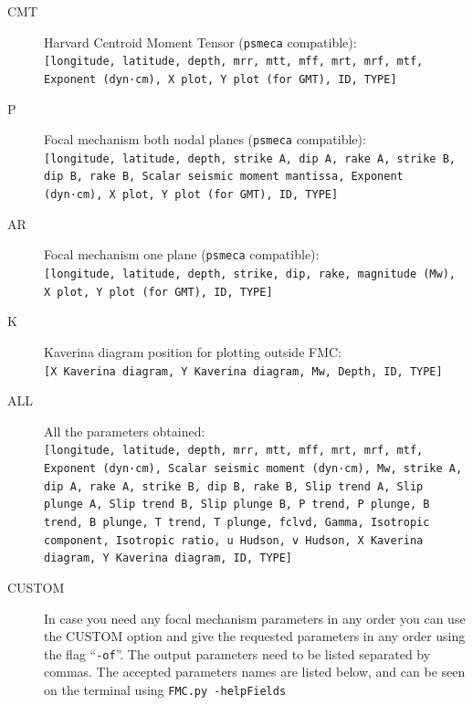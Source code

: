 \documentclass[11pt,a4paper,english]{article}
\numberwithin{equation}{section}
\begin{document}
\begin{description}
\item[CMT] Harvard Centroid Moment Tensor (\texttt{psmeca} compatible):\\
\texttt{[longitude, latitude, depth, mrr, mtt, mff, mrt, mrf, mtf, Exponent (dyn·cm), X plot, Y plot (for GMT), ID, TYPE]}
\item[P] Focal mechanism both nodal planes (\texttt{psmeca} compatible):\\
\texttt{[longitude, latitude, depth, strike A, dip A, rake A, strike B, dip B, rake B, Scalar seismic moment mantissa, Exponent (dyn·cm), X plot, Y plot (for GMT), ID, TYPE]}
\item[AR] Focal mechanism one plane (\texttt{psmeca} compatible):\\
\texttt{[longitude, latitude, depth, strike, dip, rake, magnitude (Mw), X plot, Y plot (for GMT), ID, TYPE]}
\item[K] Kaverina diagram position for plotting outside FMC:\\
\texttt{[X Kaverina diagram, Y Kaverina diagram, Mw, Depth, ID, TYPE]}
\item[ALL] All the parameters obtained:\\
\texttt{[longitude, latitude, depth, mrr, mtt, mff, mrt, mrf, mtf, Exponent (dyn·cm), Scalar seismic moment (dyn·cm), Mw, strike A, dip A, rake A, strike B, dip B, rake B, Slip trend A, Slip plunge A, Slip trend B, Slip plunge B, P trend, P plunge, B trend, B plunge, T trend, T plunge, fclvd, Gamma, Isotropic component, Isotropic ratio, u Hudson, v Hudson, X Kaverina diagram, Y Kaverina diagram, ID, TYPE]}
\item[CUSTOM] In case you need any focal mechanism parameters in any order you can use the CUSTOM option and give the requested parameters in any order using the flag ``\texttt{-of}''. The output parameters need to be listed separated by commas. The accepted parameters names are listed below, and can be seen on the terminal using \texttt{FMC.py -helpFields}


\end{description}
\end{document}
